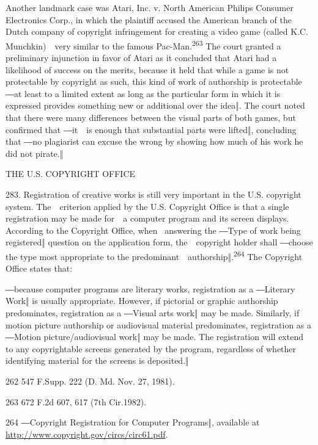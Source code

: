 \documentclass[
]{article}
\begin{document}
{Another landmark case was }{Atari, Inc. v. North American Philips
Consumer Electronics Corp., }{in which the plaintiff accused the
American branch of the Dutch company of copyright infringement for
creating a video game (called }{K.C. Munchkin}{)~~very similar to the
famous }{Pac-Man}{.}\textsuperscript{{263 }}{The court granted a
preliminary injunction in favor of Atari as it concluded that Atari had
a likelihood of success on the merits, because it held that while a game
is not protectable by copyright }{as such}{, this kind of work of
authorship is protectable }{―}{at least to a limited extent }{as long as
}{the particular form in which it is expressed provides }{something new
or additional over the idea‖}{. }{The court noted that there were many
differences between the visual parts of bot}{h games, but confirmed that
―}{it~~is enough that }{substantial parts were lifted‖, }{concluding
that ―}{no plagiarist can excuse the wrong by showing how much of his
work he did not pirate.}{‖}

{THE U.S. COPYRIGHT OFFICE}

{283. }{Registration of creative works is still very important in the
U.S. copyright system. The~~criterion applied by the U.S. Copyright
Office is that a single registration may be made for~~a computer program
and its screen displays. According to the Copyright Office, when
}{~answering the ―Type of work being registered‖ question on the
application form, the~~copyright holder shall ―}{choose the type most
appropriate to the predominant~~authorship}{‖.}\textsuperscript{{264
}}{The Copyright Office states that:}

{―}{b}{ecause computer programs are literary works, registration as a
―Literary Work‖ }{is usually appropriate. However, if pictorial or
graphic authorship predominates, registration as a }{―Visual arts work‖
may be made}{. Similarly, if motion picture authorship or audiovisual
}{material predominates, registration as a ―Motion picture/audiovisual
work‖ may be made}{. The registration will extend to any copyrightable
screens generated by the program, regardless of whether identifying
material for the screens is deposited.}{‖}

{262 }{547 F.Supp. 222 (D. Md. Nov. 27, 1981).}

{263 }{672 F.2d 607, 617 (7th Cir.1982).}

{264 }{―Copyright Registration for Computer Programs‖, available at
}\href{http://www.copyright.gov/circs/circ61.pdf}{{http://www.copyright.gov/circs/circ61.pdf}}{.}
\end{document}
